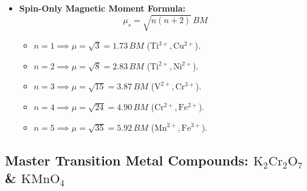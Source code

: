 \documentclass[10pt,a4paper]{article}
\begin{document}
\begin{itemize}
  \item \textbf{Spin-Only Magnetic Moment Formula:}
  \begin{equation}
    \mu_s = \sqrt{n(n + 2)}\,\si{BM}
  \end{equation}
  \begin{itemize}
    \item $n=1 \implies \mu = \sqrt{3} = 1.73\,\si{BM}$ ($\mathrm{Ti^{3+}, Cu^{2+}}$).
    \item $n=2 \implies \mu = \sqrt{8} = 2.83\,\si{BM}$ ($\mathrm{Ti^{2+}, Ni^{2+}}$).
    \item $n=3 \implies \mu = \sqrt{15} = 3.87\,\si{BM}$ ($\mathrm{V^{2+}, Cr^{3+}}$).
    \item $n=4 \implies \mu = \sqrt{24} = 4.90\,\si{BM}$ ($\mathrm{Cr^{2+}, Fe^{2+}}$).
    \item $n=5 \implies \mu = \sqrt{35} = 5.92\,\si{BM}$ ($\mathrm{Mn^{2+}, Fe^{3+}}$).
  \end{itemize}
\end{itemize}

\subsection{Master Transition Metal Compounds: $\mathrm{K_2Cr_2O_7}$ \& $\mathrm{KMnO_4}$}
\end{document}
